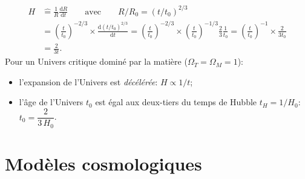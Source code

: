 \documentclass[a4paper,10pt]{report}
\renewcommand{\d}{\ensuremath{\mathrm{d}}}
\newcommand{\defeq}{\mathrel{\widehat=}}
\begin{document}
\begin{Answer}
  \begin{align*}
    H &\defeq \frac{1}{R}\frac{\d R}{\d t}
    \qquad\text{avec}\qquad R/R_{0} = (t/t_{0})^{2/3}\\
    &= \left ( \frac{t}{t_0} \right )^{-2/3} \times
    \frac{\d\left( t/t_0 \right )^{2/3}}{\d t} 
    = \left ( \frac{t}{t_0} \right )^{-2/3} \times
    \left( \frac{t}{t_0} \right)^{-1/3} \frac{2}{3} \frac{1}{t_0} 
    = \left( \frac{t}{t_0} \right)^{-1} \times \frac{2}{3t_0} \\
    &= \frac{2}{3t}.
  \end{align*}
  Pour un Univers critique dominé par la matière ($\Omega_{T} =
  \Omega_{M} = 1$):
  \begin{itemize}
  \item l'expansion de l'Univers est \emph{décélérée}: $H \propto 1/t$;
  \item l'âge de l'Univers $t_{0}$ est égal aux deux-tiers du temps de
    Hubble $t_{H} = 1/H_{0}$: $t_{0} = \dfrac{2}{3\,H_{0}}$.
  \end{itemize}
\end{Answer}

\section{Modèles cosmologiques}
\end{document}
